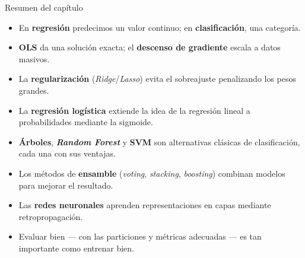 \documentclass[aspectratio=169]{beamer}
\begin{document}
\begin{frame}{Resumen del capítulo}
  \small
  \begin{itemize}
    \item En \textbf{regresión} predecimos un valor continuo; en \textbf{clasificación}, una categoría.
    \item \textbf{OLS} da una solución exacta; el \textbf{descenso de gradiente} escala a datos masivos.
    \item La \textbf{regularización} (\textit{Ridge}/\textit{Lasso}) evita el sobreajuste penalizando los pesos grandes.
    \item La \textbf{regresión logística} extiende la idea de la regresión lineal a probabilidades mediante la sigmoide.
    \item \textbf{Árboles}, \textbf{\textit{Random Forest}} y \textbf{SVM} son alternativas clásicas de clasificación, cada una con sus ventajas.
    \item Los métodos de \textbf{ensamble} (\textit{voting}, \textit{stacking}, \textit{boosting}) combinan modelos para mejorar el resultado.
    \item Las \textbf{redes neuronales} aprenden representaciones en capas mediante retropropagación.
    \item Evaluar bien --- con las particiones y métricas adecuadas --- es tan importante como entrenar bien.
  \end{itemize}
\end{frame}
\end{document}
